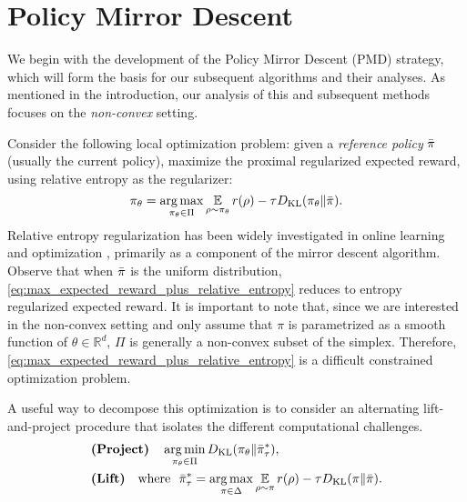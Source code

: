
\section{Policy Mirror Descent}
\label{subsec:revisitTRPO}

\newcommand{\real}{\mathbb{R}}


We begin with the development of the Policy Mirror Descent (PMD) strategy,
which will form the basis for our subsequent algorithms and their analyses.
As mentioned in the introduction, our analysis of this and subsequent methods
focuses on the \emph{non-convex} setting.

Consider the following local optimization problem:
given a \emph{reference policy} $\bar{\pi}$ (usually the current policy), 
maximize the proximal regularized expected reward,
using relative entropy as the regularizer:
%
\begin{equation}
\label{eq:max_expected_reward_plus_relative_entropy}
\pi_{\theta} = \operatorname*{arg\,max}\limits_{\pi_\theta \in \Pi} { \operatorname*{\mathbb{E}}\limits_{\rho \sim \pi_\theta}{  r(\rho)  - \tau D_{\mathrm{KL}}(\pi_\theta \| \bar{\pi}) } }.
\end{equation}
%
Relative entropy regularization has been widely investigated in
online learning and optimization
\citep{nemirovskii1983problem,beck2003mirror},
primarily as a component of the mirror descent algorithm.
Observe that when $\bar{\pi}$ is the uniform distribution,
\cref{eq:max_expected_reward_plus_relative_entropy}
reduces to entropy regularized expected reward.
It is important to note that,
since we are interested in the non-convex setting
and only assume that
$\pi$ is parametrized as a smooth
function of $\theta \in \real^d$,
$\Pi$ is generally a non-convex subset of the simplex.
Therefore, 
\cref{eq:max_expected_reward_plus_relative_entropy}
is a difficult constrained optimization problem.

A useful way to decompose this optimization
is to consider an alternating lift-and-project procedure
that isolates the different computational challenges.
%
{\small
\begin{equation}
\label{eq:pmd}
\begin{aligned}
&\text{\bf (Project)} \quad \operatorname*{arg\,min}\limits_{\pi_\theta \in \Pi}{D_{\mathrm{KL}}( \pi_\theta \| \bar{\pi}_{\tau}^* )}, \\
&\text{\bf (Lift)}  \quad  \text{where}\ \ \bar{\pi}_{\tau}^* =  \operatorname*{arg\,max}\limits_{\pi \in \Delta}{ \operatorname*{\mathbb{E}}\limits_{\rho \sim \pi}{  r(\rho)  - \tau D_{\mathrm{KL}}(\pi \| \bar{\pi}) } }.
\end{aligned}
\end{equation}
}
%

